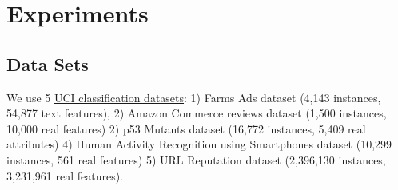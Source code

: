 \section{Experiments}
\label{sec:experiments}

\subsection{Data Sets}

We use 5 \href{http://archive.ics.uci.edu/ml/datasets.html}{UCI classification
datasets}: 1) Farms Ads dataset (4,143 instances, 54,877 text features), 2)
Amazon Commerce reviews dataset (1,500 instances, 10,000 real features) 2) p53
Mutants dataset (16,772 instances, 5,409 real attributes) 4) Human Activity
Recognition using Smartphones dataset (10,299 instances, 561 real features) 5)
URL Reputation dataset (2,396,130 instances, 3,231,961 real features).
